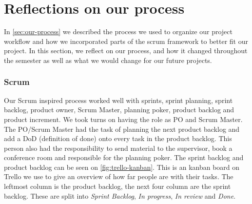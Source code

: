 \section{Reflections on our process}
In \autoref{sec:our-process} we described the process we used to organize our project workflow and how we incorporated parts of the scrum framework to better fit our project.
In this section, we reflect on our process, and how it changed throughout the semester as well as what we would change for our future projects.

\subsubsection{Scrum}
Our Scrum inspired process worked well with sprints, sprint planning, sprint backlog, product owner, Scrum Master, planning poker, product backlog and product increment.
We took turns on having the role as PO and Scrum Master.
The PO/Scrum Master had the task of planning the next product backlog and add a DoD (definition of done) onto every task in the product backlog.
This person also had the responsibility to send material to the supervisor, book a conference room and responsible for the planning poker.
The sprint backlog and product backlog can be seen on \autoref{fig:trello-kanban}. 
This is an kanban board on Trello we use to give an overview of how far people are with their tasks.
The leftmost column is the product backlog, the next four column are the sprint backlog.
These are split into \textit{Sprint Backlog}, \textit{In progress}, \textit{In review} and \textit{Done}.

